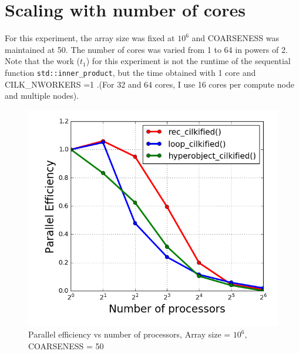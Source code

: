 \documentclass[12pt,letterpaper]{article}
\begin{document}
\section*{Scaling with number of cores}
\noindent For this experiment, the array size was fixed at $10^6$ and COARSENESS was maintained at 50. The number of cores was varied from 1 to 64 in powers of 2. Note that the work ($t_1$) for this experiment is not the runtime of the sequential function \texttt{std::inner\_product}, but the time obtained with 1 core and CILK\_NWORKERS =1 .(For 32 and 64 cores, I use 16 cores per compute node and multiple nodes).
%
\begin{figure}[h]
\centering
\includegraphics[scale=0.45]{ncores_scaling.png}
\caption{Parallel efficiency vs number of processors, Array size = $10^6$, COARSENESS = 50}
\end{figure}
%
\end{document}
